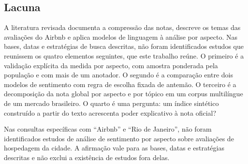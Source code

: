 \subsection{Lacuna}

A literatura revisada documenta a compressão das notas, descreve os temas das avaliações do Airbnb e aplica modelos de linguagem à análise por aspecto. Nas bases, datas e estratégias de busca descritas, não foram identificados estudos que reunissem os quatro elementos seguintes, que este trabalho reúne. O primeiro é a validação explícita da medida por aspecto, com amostra ponderada pela população e com mais de um anotador. O segundo é a comparação entre dois modelos de sentimento com regra de escolha fixada de antemão. O terceiro é a decomposição da nota global por aspecto e por tópico em um corpus multilíngue de um mercado brasileiro. O quarto é uma pergunta: um índice sintético construído a partir do texto acrescenta poder explicativo à nota oficial?

Nas consultas específicas com “Airbnb” e “Rio de Janeiro”, não foram identificados estudos de análise de sentimento por aspecto sobre avaliações de hospedagem da cidade. A afirmação vale para as bases, datas e estratégias descritas e não exclui a existência de estudos fora delas.
